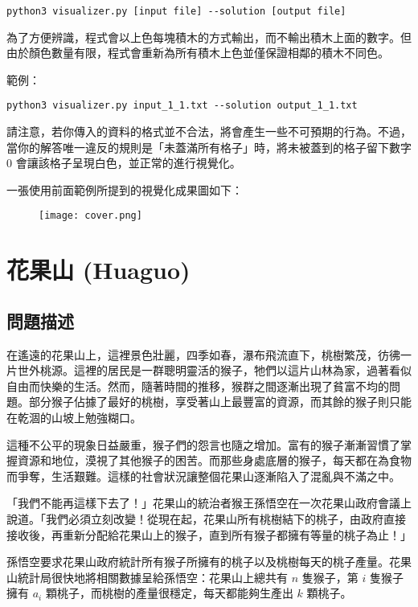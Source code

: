 \begin{verbatim}
python3 visualizer.py [input file] --solution [output file]
\end{verbatim}

為了方便辨識，程式會以上色每塊積木的方式輸出，而不輸出積木上面的數字。但由於顏色數量有限，程式會重新為所有積木上色並僅保證相鄰的積木不同色。

範例：

\begin{verbatim}
python3 visualizer.py input_1_1.txt --solution output_1_1.txt
\end{verbatim}

請注意，若你傳入的資料的格式並不合法，將會產生一些不可預期的行為。不過，當你的解答唯一違反的規則是「未蓋滿所有格子」時，將未被蓋到的格子留下數字
\(0\) 會讓該格子呈現白色，並正常的進行視覺化。

一張使用前面範例所提到的視覺化成果圖如下：

\begin{figure}[!htb]
  \centering
  \texttt{[image: cover.png]}
\end{figure}

\section{花果山 (Huaguo)}

\subsection{問題描述}

在遙遠的花果山上，這裡景色壯麗，四季如春，瀑布飛流直下，桃樹繁茂，彷彿一片世外桃源。這裡的居民是一群聰明靈活的猴子，牠們以這片山林為家，過著看似自由而快樂的生活。然而，隨著時間的推移，猴群之間逐漸出現了貧富不均的問題。部分猴子佔據了最好的桃樹，享受著山上最豐富的資源，而其餘的猴子則只能在乾涸的山坡上勉強糊口。

這種不公平的現象日益嚴重，猴子們的怨言也隨之增加。富有的猴子漸漸習慣了掌握資源和地位，漠視了其他猴子的困苦。而那些身處底層的猴子，每天都在為食物而爭奪，生活艱難。這樣的社會狀況讓整個花果山逐漸陷入了混亂與不滿之中。

「我們不能再這樣下去了！」花果山的統治者猴王孫悟空在一次花果山政府會議上說道。「我們必須立刻改變！從現在起，花果山所有桃樹結下的桃子，由政府直接接收後，再重新分配給花果山上的猴子，直到所有猴子都擁有等量的桃子為止！」

孫悟空要求花果山政府統計所有猴子所擁有的桃子以及桃樹每天的桃子產量。花果山統計局很快地將相關數據呈給孫悟空：花果山上總共有
\(n\) 隻猴子，第 \(i\) 隻猴子擁有 \(a_i\)
顆桃子，而桃樹的產量很穩定，每天都能夠生產出 \(k\) 顆桃子。

